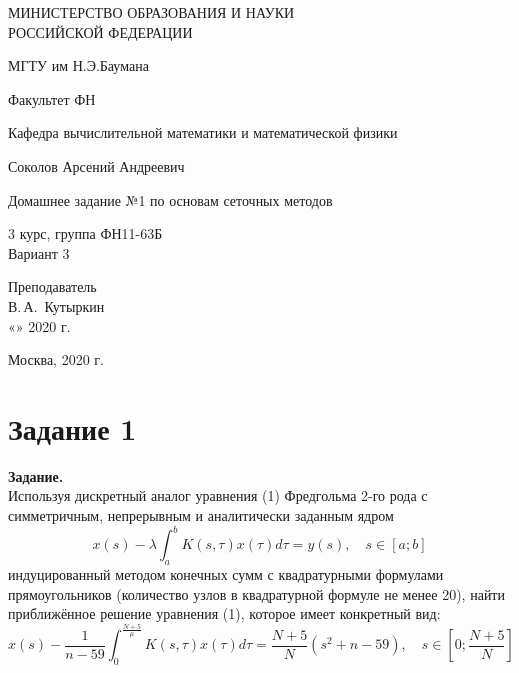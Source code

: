\documentclass[14pt,a4paper]{scrartcl}
\begin{document}
	\begin{titlepage}
	\begin{center}
		\large
		МИНИСТЕРСТВО ОБРАЗОВАНИЯ И НАУКИ\\ РОССИЙСКОЙ ФЕДЕРАЦИИ
		
		\vspace{0.5cm}
		
		МГТУ им Н.Э.Баумана
		\vspace{0.25cm}
		
		Факультет ФН
		
		Кафедра вычислительной математики и математической физики
		\vfill
		
		
		Соколов Арсений Андреевич\\
		\vfill
		
		
		{\LARGE Домашнее задание №1 по основам сеточных методов \\[2mm]
		}
		\bigskip
		
		3 курс, группа ФН11-63Б\\
		Вариант 3
	\end{center}
	\vfill
	
	\newlength{\ML}
	\hfill\begin{minipage}{0.4\textwidth}
		Преподаватель\\
		\underline{\hspace{3cm}} В.\,А.~Кутыркин\\
		«\underline{\hspace{0.7cm}}» \underline{\hspace{1.71cm}} 2020 г.
	\end{minipage}%
	\bigskip
	
	
	\vfill
	
	\begin{center}
		Москва, 2020 г.
	\end{center}
\end{titlepage}

\section*{Задание 1}
\textbf{Задание.}\\
Используя дискретный аналог уравнения (1) Фредгольма 2-го рода с симметричным, непрерывным и аналитически заданным ядром
\begin{equation}
	x(s)-\lambda \int_{a}^{b} K(s, \tau) x(\tau) d \tau=y(s), \quad s \in[a ; b]
\end{equation}
индуцированный методом конечных сумм с квадратурными формулами прямоугольников (количество узлов в квадратурной формуле не менее 20), найти приближённое решение уравнения (1), которое имеет конкретный вид:
\begin{equation*}
	x(s)-\frac{1}{n-59} \int_{0}^{\frac{N+5}{\mu}} K(s, \tau) x(\tau) d \tau=\frac{N+5}{N}\left(s^{2}+n-59\right), \quad s \in\left[0 ; \frac{N+5}{N}\right]
\end{equation*}
\end{document}
